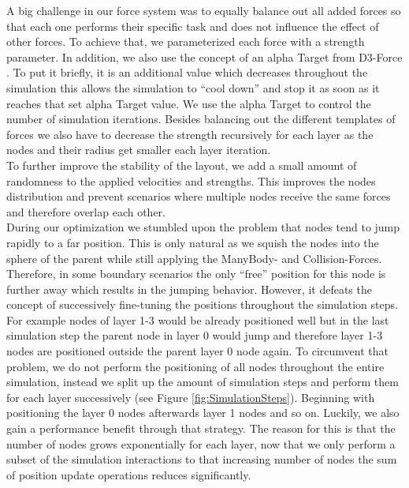 A big challenge in our force system was to equally balance out all added forces so that each one performs their specific task and does not influence the effect of other forces. To achieve that, we parameterized each force with a strength parameter.
In addition, we also use the concept of an alpha Target from D3-Force \cite{bostock_d3forcejs_nodate}. To put it briefly, it is an additional value which decreases throughout the simulation this allows the simulation to “cool down” and stop it as soon as it reaches that set alpha Target value. We use the alpha Target to control the number of simulation iterations. 
Besides balancing out the different templates of forces we also have to decrease the strength recursively for each layer as the nodes and their radius get smaller each layer iteration.\\
To further improve the stability of the layout, we add a small amount of randomness to the applied velocities and strengths. This improves the nodes distribution and prevent scenarios where multiple nodes receive the same forces and therefore overlap each other.\\
During our optimization we stumbled upon the problem that nodes tend to jump rapidly to a far position. This is only natural as we squish the nodes into the sphere of the parent while still applying the ManyBody- and Collision-Forces. Therefore, in some boundary scenarios the only “free” position for this node is further away which results in the jumping behavior. However, it defeats the concept of successively fine-tuning the positions throughout the simulation steps. For example nodes of layer 1-3 would be already positioned well but in the last simulation step the parent node in layer 0 would jump and therefore layer 1-3 nodes are positioned outside the parent layer 0 node again. To circumvent that problem, we do not perform the positioning of all nodes throughout the entire simulation, instead we split up the amount of simulation steps and perform them for each layer successively (see Figure \ref{fig:SimulationSteps}). Beginning with positioning the layer 0 nodes afterwards layer 1 nodes and so on. Luckily, we also gain a performance benefit through that strategy. The reason for this is that the number of nodes grows exponentially for each layer, now that we only perform a subset of the simulation interactions to that increasing number of nodes the sum of position update operations reduces significantly.
